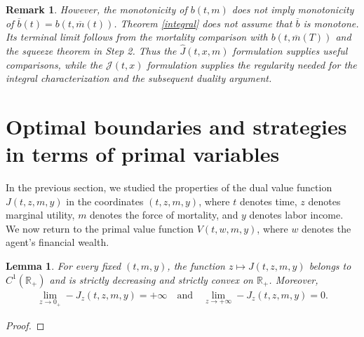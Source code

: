 \documentclass[a4paper,11pt]{amsart}
\numberwithin{equation}{section}
\newtheorem{lemma}{Lemma}[section]
\newtheorem{remark}{Remark}[section]
\begin{document}
{{{\begin{remark}
However, the monotonicity of $b(t,m)$ does not imply monotonicity of $\overline b(t)=b(t,\overline m(t))$. Theorem \ref{integral} does not assume that $\overline b$ is monotone. Its terminal limit follows from the mortality comparison with $b(t,\overline m(T))$ and the squeeze theorem in Step 2. Thus the $\widehat{J}(t,x,m)$ formulation supplies useful comparisons, while the $\mathcal J(t,x)$ formulation supplies the regularity needed for the integral characterization and the subsequent duality argument.
\end{remark}
}
}







































\section{Optimal boundaries and strategies in terms of primal variables}\label{sec5}
In the previous section, we studied the properties of the dual value function $J(t,z,m,y)$ in the coordinates $(t,z,m,y)$, where $t$ denotes time, $z$ denotes marginal utility, $m$ denotes the force of mortality, and $y$ denotes labor income. We now return to the primal value function $V(t,w,m,y)$, where $w$ denotes the agent's financial wealth.


\begin{lemma}\label{convex}
For every fixed $(t,m,y)$, the function $z\mapsto J(t,z,m,y)$ belongs to $C^1(\mathbb R_+)$ and is strictly decreasing and strictly convex on $\mathbb R_+$. Moreover, 
\begin{align*}
	\lim_{z\to 0_+}-J_z(t,z,m,y)=+\infty \quad \text{and} \quad \lim_{z \to +\infty} -J_z(t,z,m,y)=0.
\end{align*}
\end{lemma}
\begin{proof}


\end{proof}}
\end{document}
